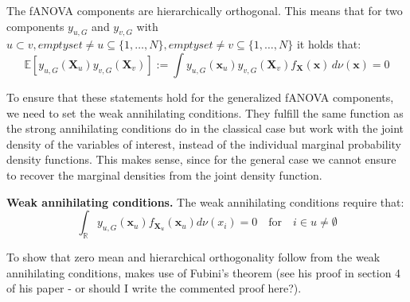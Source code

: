 \begin{proposition}
    The fANOVA components are hierarchically orthogonal. This means that for two components $y_{u, G}$ and $y_{v, G}$ with $u \subset v, emptyset \neq u \subseteq \{1, \ldots, N\}, emptyset \neq v \subseteq \{1, \ldots, N\} $ it holds that:
\begin{equation}
    \mathbb{E}[y_{u, G}(\boldsymbol{X}_u)y_{v, G}(\boldsymbol{X}_v)] := \int y_{u, G}(\boldsymbol{x}_u) y_{v, G}(\boldsymbol{X}_v) f_{\boldsymbol{X}}(\boldsymbol{x}) \, d\nu (\boldsymbol{x}) = 0
\end{equation}
\label{eq:orthogonality_g}
\end{proposition}

To ensure that these statements hold for the generalized fANOVA components, we need to set the weak annihilating conditions.
They fulfill the same function as the strong annihilating conditions do in the classical case but work with the joint density of the variables of interest, instead of the individual marginal probability density functions.
This makes sense, since for the general case we cannot ensure to recover the marginal densities from the joint density function. {\color{red}{Is this really the reason? Or is the reason: When there are dependencies between variables then the individual pdfs would not assign the ``correct weight'' as they ignore the dependence between features in $u$.}}
\begin{proposition}
    \textbf{Weak annihilating conditions.}
    The weak annihilating conditions require that:
\begin{equation}
    \int_{\mathbb{R}} y_{u, G}(\boldsymbol{x}_u) f_{\boldsymbol{X}_u}(\boldsymbol{x}_u) d\nu (x_i) = 0 \quad \text{for} \quad i \in u \neq \emptyset
\end{equation}
\end{proposition}

To show that zero mean and hierarchical orthogonality follow from the weak annihilating conditions, \cite{rahman2014} makes use of Fubini's theorem (see his proof in section 4 of his paper - or should I write the commented proof here?).




